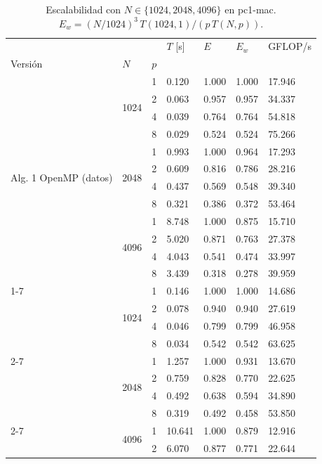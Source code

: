 \begin{table}[H]
\centering\small
\caption{Escalabilidad con $N\in\{1024, 2048, 4096\}$ en pc1-mac. $E_w = (N/1024)^3\,T(1024,1)/(p\,T(N,p))$.}
\label{tab:f_escalabilidad_pc1-mac}
\begin{tabular}{lllllll}
\toprule
 &  &  & $T$ [s] & $E$ & $E_w$ & GFLOP/s \\
Versión & $N$ & $p$ &  &  &  &  \\
\midrule
\multirow[t]{12}{*}{Alg. 1 OpenMP (datos)} & \multirow[t]{4}{*}{1024} & 1 & 0.120 & 1.000 & 1.000 & 17.946 \\
 &  & 2 & 0.063 & 0.957 & 0.957 & 34.337 \\
 &  & 4 & 0.039 & 0.764 & 0.764 & 54.818 \\
 &  & 8 & 0.029 & 0.524 & 0.524 & 75.266 \\
\cline{2-7}
 & \multirow[t]{4}{*}{2048} & 1 & 0.993 & 1.000 & 0.964 & 17.293 \\
 &  & 2 & 0.609 & 0.816 & 0.786 & 28.216 \\
 &  & 4 & 0.437 & 0.569 & 0.548 & 39.340 \\
 &  & 8 & 0.321 & 0.386 & 0.372 & 53.464 \\
\cline{2-7}
 & \multirow[t]{4}{*}{4096} & 1 & 8.748 & 1.000 & 0.875 & 15.710 \\
 &  & 2 & 5.020 & 0.871 & 0.763 & 27.378 \\
 &  & 4 & 4.043 & 0.541 & 0.474 & 33.997 \\
 &  & 8 & 3.439 & 0.318 & 0.278 & 39.959 \\
\cline{1-7} \cline{2-7}
\multirow[t]{12}{*}{Alg. 2 OpenMP (D\&C tareas)} & \multirow[t]{4}{*}{1024} & 1 & 0.146 & 1.000 & 1.000 & 14.686 \\
 &  & 2 & 0.078 & 0.940 & 0.940 & 27.619 \\
 &  & 4 & 0.046 & 0.799 & 0.799 & 46.958 \\
 &  & 8 & 0.034 & 0.542 & 0.542 & 63.625 \\
\cline{2-7}
 & \multirow[t]{4}{*}{2048} & 1 & 1.257 & 1.000 & 0.931 & 13.670 \\
 &  & 2 & 0.759 & 0.828 & 0.770 & 22.625 \\
 &  & 4 & 0.492 & 0.638 & 0.594 & 34.890 \\
 &  & 8 & 0.319 & 0.492 & 0.458 & 53.850 \\
\cline{2-7}
 & \multirow[t]{4}{*}{4096} & 1 & 10.641 & 1.000 & 0.879 & 12.916 \\
 &  & 2 & 6.070 & 0.877 & 0.771 & 22.644 \\

\end{tabular}
\end{table}
